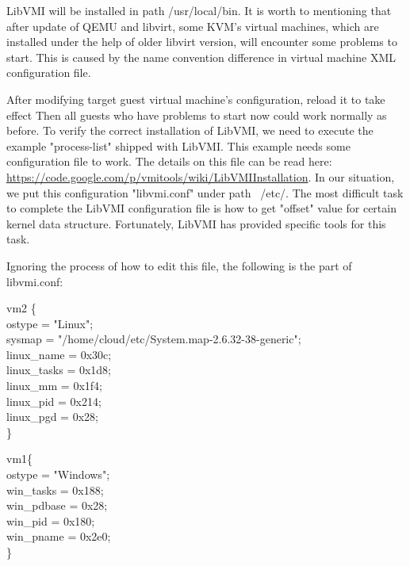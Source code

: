 LibVMI will be installed in path /usr/local/bin. It is worth to mentioning that after update of QEMU and libvirt, 
some KVM's virtual machines, which are installed under the help of older libvirt version, will encounter some problems 
to start. This is caused by the name convention difference in virtual machine XML configuration file.

After modifying target guest virtual machine's configuration, reload it to take effect
Then all guests who have problems to start now could work normally as before. To verify the correct installation of 
LibVMI, we need to execute the example "process-list" shipped with LibVMI. This example needs some configuration file 
to work. The details on this file can be read here: \url{https://code.google.com/p/vmitools/wiki/LibVMIInstallation}. In
our situation, we put this configuration "libvmi.conf" under path ~/etc/. The most difficult task to complete the LibVMI 
configuration file is how to get "offset" value for certain kernel data structure. Fortunately, LibVMI has provided 
specific tools for this task.

Ignoring the process of how to edit this file, the following is the part of libvmi.conf:

vm2 \{\\
	ostype = "Linux";\\
	sysmap = "/home/cloud/etc/System.map-2.6.32-38-generic";\\
	linux\_name = 0x30c;\\
	linux\_tasks = 0x1d8;\\
	linux\_mm = 0x1f4;\\
	linux\_pid = 0x214;\\
	linux\_pgd = 0x28;\\
\}

vm1\{
\\
	ostype = "Windows";
\\
    	win\_tasks   = 0x188;
\\
    	win\_pdbase  = 0x28;
\\
   	win\_pid     = 0x180;\\
    	win\_pname   = 0x2e0;\\
\}

